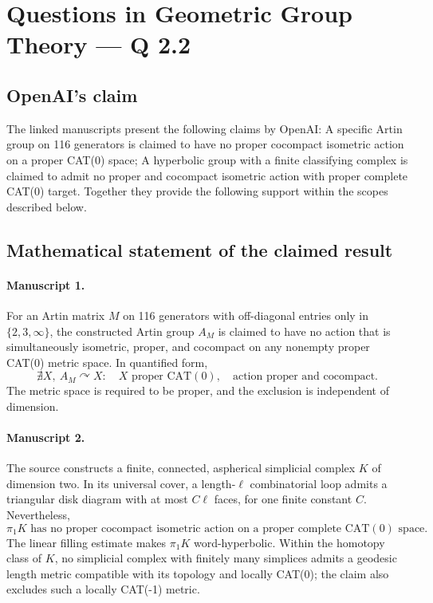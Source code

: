 \documentclass[11pt]{article}
\begin{document}
\section*{Questions in Geometric Group Theory — Q 2.2}

\subsection{OpenAI's claim}
The linked manuscripts present the following claims by OpenAI: A specific Artin group on 116 generators is claimed to have no proper cocompact isometric action on a proper CAT(0) space; A hyperbolic group with a finite classifying complex is claimed to admit no proper and cocompact isometric action with proper complete CAT(0) target. Together they provide the following support within the scopes described below.

\subsection{Mathematical statement of the claimed result}
\paragraph{Manuscript 1.}
For an Artin matrix \(M\) on 116 generators with off-diagonal entries only in \(\{2,3,\infty\}\), the constructed Artin group \(A_M\) is claimed to have no action that is simultaneously isometric, proper, and cocompact on any nonempty proper CAT(0) metric space. In quantified form,
\[
 \nexists X,\ A_M\curvearrowright X:\quad
 X\text{ proper CAT}(0),\quad\text{action proper and cocompact}.
\]
The metric space is required to be proper, and the exclusion is independent of dimension.

\paragraph{Manuscript 2.}
The source constructs a finite, connected, aspherical simplicial complex \(K\) of dimension two. In its universal cover, a length-\(\ell\) combinatorial loop admits a triangular disk diagram with at most \(C\ell\) faces, for one finite constant \(C\). Nevertheless,
\[
 \pi_1K\text{ has no proper cocompact isometric action on a proper complete CAT}(0)\text{ space}.
\]
The linear filling estimate makes \(\pi_1K\) word-hyperbolic. Within the homotopy class of \(K\), no simplicial complex with finitely many simplices admits a geodesic length metric compatible with its topology and locally CAT(0); the claim also excludes such a locally CAT(-1) metric.
\end{document}
